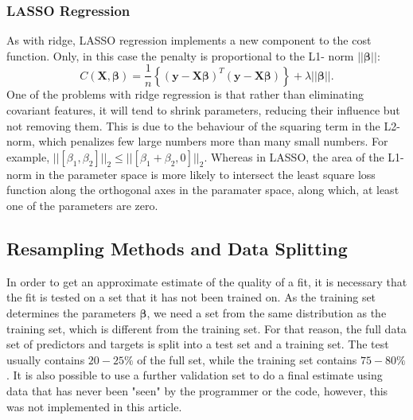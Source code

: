 \documentclass[11pt,a4paper]{article}
\begin{document}
\subsubsection{LASSO Regression}
As with ridge, LASSO regression implements a new component to the cost function. Only, in this case the penalty is proportional to the L1- norm $\vert\vert \boldsymbol{\beta}\vert\vert$:
\begin{equation*}
    C(\boldsymbol{X},\boldsymbol{\beta})=\frac{1}{n}\left\{(\boldsymbol{y}-\boldsymbol{X}\boldsymbol{\beta})^T(\boldsymbol{y}-\boldsymbol{X}\boldsymbol{\beta})\right\}+\lambda\vert\vert \boldsymbol{\beta}\vert\vert.
\end{equation*}
One of the problems with ridge regression is that rather than eliminating covariant features, it will tend to shrink parameters, reducing their influence but not removing them. This is due to the behaviour of the squaring term in the L2- norm, which penalizes few large numbers more than many small numbers. For example, $\vert\vert[\beta_1,\beta_2]\vert\vert_2 \leq \vert\vert[\beta_1+\beta_2,0]\vert\vert_2$. Whereas in LASSO, the area of the L1- norm in the parameter space is more likely to intersect the least square loss function along the orthogonal axes in the paramater space, along which, at least one of the parameters are zero.
\subsection{Resampling Methods and Data Splitting}
In order to get an approximate estimate of the quality of a fit, it is necessary that the fit is tested on a set that it has not been trained on. As the training set determines the parameters $\bm{\beta}$, we need a set from the same distribution as the training set, which is different from the training set. For that reason, the full data set of predictors and targets is split into a test set and a training set. The test usually contains $20-25\%$ of the full set, while the training set contains $75-80\%$. It is also possible to use a further validation set to do a final estimate using data that has never been "seen" by the programmer or the code, however, this was not implemented in this article.
\end{document}
